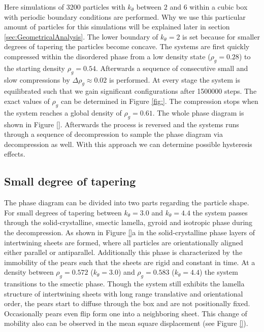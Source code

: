 \documentclass[epj,onecolumn]{webofc}
\begin{document}
Here simulations of 3200 particles with $k_{\theta}$ between $2$ and $6$ within a cubic box with periodic boundary conditions are performed. Why we use this particular amount of particles for this simulations will be explained 
later in section \ref{sec:GeometricalAnalysis}. The lower boundary of $k_{\theta}=2$ is set because for smaller degrees of tapering the particles become concave. The systems are first quickly compressed within the disordered phase from a low density state ($\rho_g=0.28$)  to the starting density $\rho_g=0.54$.  Afterwards a sequence of consecutive small and slow compressions by $\Delta\rho_g\approx 0.02$ is performed. At every stage the system is equilibrated such that we gain significant configurations after 1500000 steps. The exact values of $\rho_g$ can be determined in Figure \ref{fig:}. The compression stops when the system reaches a global density of $\rho_g=0.61$. The whole phase diagram is shown in Figure \ref{}. Afterwards the process is reversed and the systems runs through a sequence of decompression to sample the phase diagram via decompression as well. With this approach we can determine possible hysteresis effects.

\subsection{Small degree of tapering}
\label{sec:Small_k_theta}

The phase diagram can be divided into two parts regarding the particle shape. For small degrees of tapering between $k_{\theta}=3.0$ and $k_{\theta}=4.4$ the system passes through the solid-crystalline, smectic lamella, 
gyroid and isotropic phase during the decompression. As shown in Figure \ref{}a in the solid-crystalline phase layers of intertwining sheets are formed, where all particles are  orientationally aligned either parallel or antiparallel. 
Additionally this phase is characterized by the immobility of the pears such that the sheets are rigid and constant in time. At a density between $\rho_g=0.572$ ($k_{\theta}=3.0$) and $\rho_g=0.583$ ($k_{\theta}=4.4$) the 
system transitions  to the smectic phase.  Though the system still exhibits the lamella structure of intertwining sheets with long range translative and orientational order, the pears start to diffuse through the box and are not 
positionally fixed. Occasionally pears even flip form one into a neighboring sheet. This change of mobility also can be observed in the mean square displacement (see Figure \ref{}).\\
\end{document}
